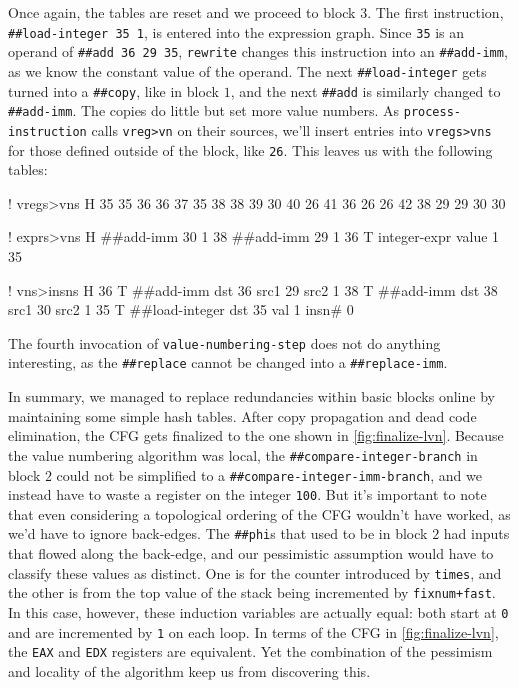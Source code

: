 Once again, the tables are reset and we proceed to block $3$.  The first
instruction,
%
\Verb|##load-integer 35 1|,
%
is entered into the expression graph.  Since \Verb|35| is an operand of
%
\Verb|##add 36 29 35|,
%
\Verb|rewrite| changes this instruction into an \Verb|##add-imm|, as we
know the constant value of the operand.  The next \Verb|##load-integer| gets
turned into a \Verb|##copy|, like in block $1$, and the next \Verb|##add|
is similarly changed to \Verb|##add-imm|.  The copies do little but set more
value numbers.  As \Verb|process-instruction| calls \Verb|vreg>vn| on their
sources, we'll insert entries into \Verb|vregs>vns| for those defined outside
of the block, like \Verb|26|.  This leaves us with the following tables:
%
  \begin{factorcode}
    ! vregs>vns
    H{
        { 35 35 }
        { 36 36 }
        { 37 35 }
        { 38 38 }
        { 39 30 }
        { 40 26 }
        { 41 36 }
        { 26 26 }
        { 42 38 }
        { 29 29 }
        { 30 30 }
    }

    ! exprs>vns
    H{
        { { ##add-imm 30 1 } 38 }
        { { ##add-imm 29 1 } 36 }
        { T{ integer-expr { value 1 } } 35 }
    }

    ! vns>insns
    H{
        { 36 T{ ##add-imm { dst 36 } { src1 29 } { src2 1 } } }
        { 38 T{ ##add-imm { dst 38 } { src1 30 } { src2 1 } } }
        { 35 T{ ##load-integer { dst 35 } { val 1 } { insn# 0 } } }
    }
  \end{factorcode}
%
\noindent The fourth invocation of \Verb|value-numbering-step| does not do
anything interesting, as the \Verb|##replace| cannot be changed into a
\Verb|##replace-imm|.


In summary, we managed to replace redundancies within basic blocks online by
maintaining some simple hash tables.  After copy propagation and dead code
elimination, the \gls{CFG} gets finalized to the one shown in
\vref{fig:finalize-lvn}.  Because the value numbering algorithm was local, the
\Verb|##compare-integer-branch| in block $2$ could not be simplified to a
\Verb|##compare-integer-imm-branch|, and we instead have to waste a register
on the integer \Verb|100|.  But it's important to note that even considering
a topological ordering of the \gls{CFG} wouldn't have worked, as we'd have to
ignore back-edges.  The \Verb|##phi|s that used to be in block $2$ had inputs
that flowed along the back-edge, and our pessimistic assumption would have to
classify these values as distinct.  One is for the counter introduced by
\Verb|times|, and the other is from the top value of the stack being
incremented by \Verb|fixnum+fast|.  In this case, however, these induction
variables are actually equal: both start at \Verb|0| and are incremented by
\Verb|1| on each loop.  In terms of the \gls{CFG} in \vref{fig:finalize-lvn},
the \Verb|EAX| and \Verb|EDX| registers are equivalent.  Yet the
combination of the pessimism and locality of the algorithm keep us from
discovering this.
